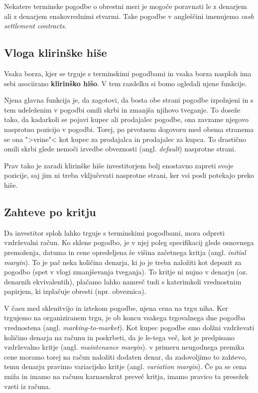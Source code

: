\documentclass[a4paper, 11pt]{article}
\begin{document}
Nekatere terminske pogodbe o obrestni meri je mogoče poravnati le z denarjem ali z denarjem 
enakovrednimi stvarmi. Take pogodbe v angleščini imenujemo \textit{cash settlement contracts}.

\subsection{Vloga klirinške hiše}
Vsaka borza, kjer se trguje s terminskimi pogodbami in vsaka borza nasploh ima sebi asociirano 
\textbf{klirinško hišo}. V tem razdelku si bomo ogledali njene funkcije.

Njena glavna funkcija je, da zagotovi, da bosta obe strani pogodbe izpolnjeni in s tem 
udeleženim v pogodbi omili skrbi in zmanjša njihovo tveganje. To doseže tako, da kadarkoli
se pojavi kupec ali prodajalec pogodbe, ona zavzame njegovo nasprotno pozicijo v pogodbi.
Torej, po prvotnem dogovoru med obema stranema se ona ">vrine"< kot kupec za prodajalca in 
prodajalec za kupca. To drastično omili skrbi glede nemoči izvedbe obveznosti (angl. 
\textit{default}) nasprotne strani. 

Prav tako je zaradi klirinške hiše investitorjem bolj enostavno zapreti svoje pozicije, saj 
jim ni treba vključevati nasprotne strani, ker vsi posli potekajo preko hiše. 

\subsection{Zahteve po kritju}
Da investitor sploh lahko trguje s terminskimi pogodbami, mora odpreti vzdrževalni račun. 
Ko sklene pogodbo, je v njej poleg specifikacij glede osnovnega premoženja, datuma in cene 
opredeljena še višina začetnega kritja (angl. \textit{initial margin}). To je pač neka 
količina denarja, ki jo je treba naložiti kot depozit za pogodbo (spet v vlogi zmanjševanja 
tveganja). To kritje ni nujno v denarju (oz. denarnih ekvivalentih), plačamo lahko namreč 
tudi s katerimkoli vrednostnim papirjem, ki izplačuje obresti (npr. obveznica).

V času med sklenitvijo in iztekom pogodbe, njena cena na trgu niha. Ker trgujemo na organiziranem
trgu, je ob koncu vsakega trgovalnega dne pogodba vrednostena (angl. \textit{marking-to-market}). 
Kot kupec pogodbe smo dolžni vzdrževati količino denarja na računu in poskrbeti, da je le-tega več, 
kot je predpisano vzdrževalno kritje (angl. \textit{maintenance margin}). v primeru neugodnega 
premika cene moramo torej na račun naložiti dodaten denar, da zadovoljimo to zahtevo, temu denarju 
pravimo variacijsko kritje (angl. \textit{variation margin}). Če pa se cena zniža in imamo na 
računu karnaenkrat preveč kritja, imamo pravico ta presežek vzeti iz računa. 
\end{document}
